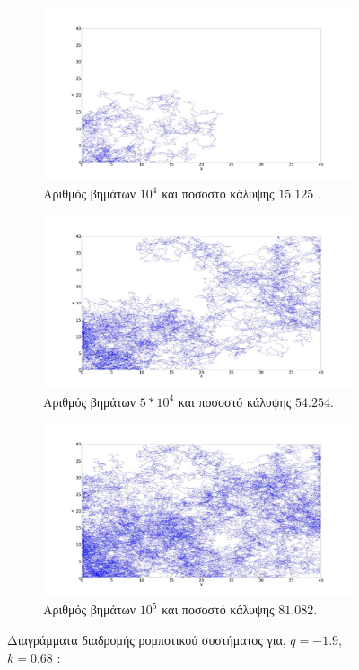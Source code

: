 \begin{figure}[ht]
	\centering
	\begin{subfigure}[b]{0.75\textwidth}
		\centering
		\includegraphics[width=\textwidth]{LateX images/log/steps/g1-1.9}
		\caption{Αριθμός βημάτων $10^4$ και ποσοστό κάλυψης $15.125$ .}
		\label{f:g113}
	\end{subfigure}
	\hfill
	\begin{subfigure}[b]{0.75\textwidth}
		\centering
		\includegraphics[width=\textwidth]{LateX images/log/steps/g2-1.9}
		\caption{Αριθμός βημάτων $5*10^4$ και ποσοστό κάλυψης $54.254$.}
		\label{f:g114}
	\end{subfigure}
	\hfill
	\begin{subfigure}[b]{0.75\textwidth}
		\centering
		\includegraphics[width=\textwidth]{LateX images/log/steps/g4-1.9}
		\caption{Αριθμός βημάτων $10^5$ και ποσοστό κάλυψης $81.082$.}
		\label{f:g115}
	\end{subfigure}
	\hfill
	\caption{Διαγράμματα διαδρομής ρομποτικού συστήματος για, $q = -1.9$, $k = 0.68$ :}
\end{figure}
\clearpage

